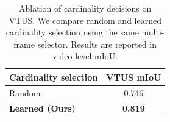 \begin{table}[t]
\centering
\caption{Ablation of cardinality decisions on VTUS.
We compare random and learned cardinality
selection using the same multi-frame selector.
Results are reported in video-level mIoU.}
\label{tab:vtus_cardinality_decision_ablation}
\small
\begin{tabular}{@{}lc@{}}
\toprule
\textbf{Cardinality selection} & \textbf{VTUS mIoU} \\
\midrule
Random & 0.746 \\
\textbf{Learned (Ours)} & \textbf{0.819} \\
\bottomrule
\end{tabular}
\end{table}
